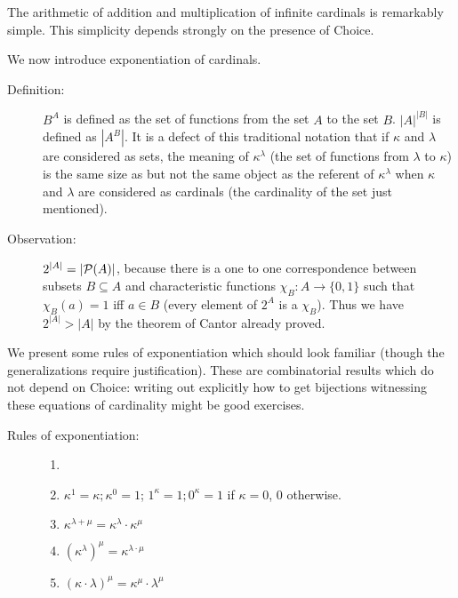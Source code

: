 \documentclass[12pt]{book}
\begin{document}
The arithmetic of addition and multiplication of infinite cardinals is
remarkably simple.  This simplicity depends strongly on the presence
of Choice.

We now introduce exponentiation of cardinals.

\begin{description}

\item[Definition:]  $B^A$ is defined as the set of functions from the set $A$ to the set $B$.  $|A|^{|B|}$ is defined as
$|A^B|$.  It is a defect of this traditional notation that if $\kappa$ and $\lambda$ are considered as sets, the meaning of
$\kappa^{\lambda}$ (the set of functions from $\lambda$ to $\kappa$) is the same size as but not the same object as the referent of
$\kappa^{\lambda}$ when $\kappa$ and $\lambda$ are considered as cardinals (the cardinality of the set just mentioned).

\item[Observation:]  $2^{|A|} = |{\cal P}(A)|$, because there is a one to one correspondence between subsets $B \subseteq A$ and
characteristic functions $\chi_B:A \rightarrow \{0,1\}$ such that $\chi_B(a) = 1$ iff $a \in B$ (every element of $2^A$ is a $\chi_B$).  Thus we have $2^{|A|}>|A|$ by the theorem of Cantor already proved.

\end{description}

We present some rules of exponentiation which should look familiar (though the generalizations require justification).  These are combinatorial results which do not depend on Choice:  writing out explicitly how to get bijections witnessing these equations of cardinality might be good exercises.
\begin{description}
\item[Rules of exponentiation:]

\begin{enumerate}

\item[]

\item $\kappa^1 = \kappa; \kappa^0 = 1$; $1^{\kappa}=1; 0^{\kappa}=1$ if $\kappa=0$, 0 otherwise.

\item  $\kappa^{\lambda + \mu} = \kappa^{\lambda} \cdot \kappa^{\mu}$

\item  $(\kappa^{\lambda})^{\mu} = \kappa^{\lambda \cdot \mu}$

\item $(\kappa\cdot \lambda)^{\mu} = \kappa^{\mu} \cdot \lambda^{\mu}$

\end{enumerate}

\end{description}
\end{document}
